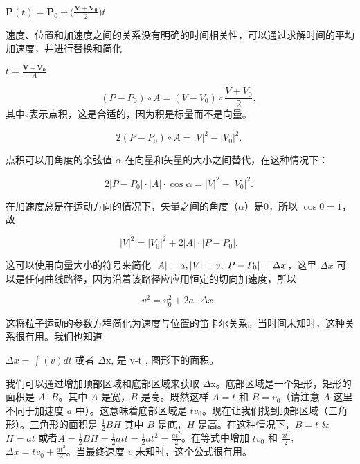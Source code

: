 $\mathbf{P}(t)=\mathbf{P}_{0}+\Big(\frac{\mathbf{V}+\mathbf{V_0}}{2}\Big )t$

速度、位置和加速度之间的关系没有明确的时间相关性，可以通过求解时间的平均加速度，并进行替换和简化

$t=\frac{\mathbf{V}-\mathbf{V_0}}{A}$

\begin{equation}
(P - P_0) \circ A = (V - V_0) \circ \frac{V + V_0}{2},~
\end{equation}
其中$\circ$表示点积，这是合适的，因为积是标量而不是向量。

\begin{equation}
2(P - P_0) \circ A = |V|^2 - |V_0|^2.~
\end{equation}

点积可以用角度的余弦值 $\alpha$ 在向量和矢量的大小之间替代，在这种情况下：

\begin{equation}
2|P - P_0| \cdot |A| \cdot \cos \alpha = |V|^2 - |V_0|^2.~
\end{equation}

在加速度总是在运动方向的情况下，矢量之间的角度（$\alpha$）是0，所以 $\cos 0 = 1$，故

\begin{equation}
|V|^2 = |V_0|^2 + 2|A| \cdot |P - P_0|.~
\end{equation}

这可以使用向量大小的符号来简化 $\\|A\\| = a, \\|V\\| = v, \\|P - P_0\\| = \Delta x$，这里 $\Delta x$ 可以是任何曲线路径，因为沿着该路径应应用恒定的切向加速度，所以

\begin{equation}
v^2 = v_0^2 + 2a \cdot \Delta x.~
\end{equation}

这将粒子运动的参数方程简化为速度与位置的笛卡尔关系。当时间未知时，这种关系很有用。我们也知道

$\Delta x = \int(v)dt$ 或者 $\Delta$x, 是 v-t , 图形下的面积。

我们可以通过增加顶部区域和底部区域来获取 $\Delta$x。底部区域是一个矩形，矩形的面积是 $A \cdot B$。其中 $A$ 是宽，$B$ 是高。既然这样 $A=t$ 和 $B=v_0$（请注意 $A$ 这里不同于加速度 $a$ 中）。这意味着底部区域是 $tv_0$。现在让我们找到顶部区域（三角形）。三角形的面积是 $\frac{1}{2}BH$ 其中 $B$ 是底，$H$ 是高。在这种情况下，$B=t$ & $H=at$ 或者$A = \frac{1}{2}BH = \frac{1}{2}att = \frac{1}{2}at^2 = \frac{at^2}{2}$。在等式中增加 $tv_0$ 和 $\frac{at^2}{2}$,$\Delta x = tv_0 + \frac{at^2}{2}$。当最终速度 $v$ 未知时，这个公式很有用。

